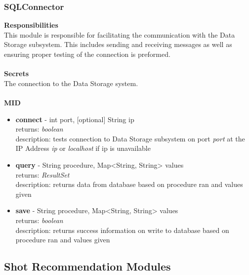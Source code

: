 \documentclass[11pt]{article}
\begin{document}
\subsubsection*{SQLConnector}
\textbf{Responsibilities} \\
This module is responsible for facilitating the communication with the Data Storage subsystem. This includes sending and receiving messages as well as ensuring proper testing of the connection is preformed. \\ \\
\textbf{Secrets} \\ 
The connection to the Data Storage system. \\ \\
\textbf{MID}
\begin{itemize}
\item \textbf{connect} - int port, [optional] String ip \\ returns: \textit{boolean} \\ description: tests connection to Data Storage subsystem on port \textit{port} at the IP Address \textit{ip} or \textit{localhost} if ip is unavailable
\item \textbf{query} - String procedure, Map<String, String> values \\ returns: \textit{ResultSet} \\ description: returns data from database based on procedure ran and values given
\item \textbf{save} - String procedure, Map<String, String> values \\ returns: \textit{boolean} \\ description: returns success information on write to database based on procedure ran and values given
\end{itemize}

\subsection{Shot Recommendation Modules} %
\end{document}
